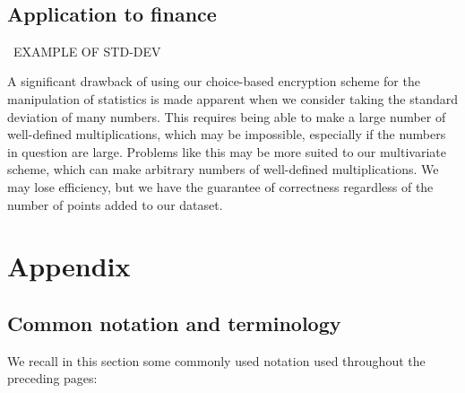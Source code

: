 \documentclass[11pt]{report}
\begin{document}
\

\section{Application to finance}

\ EXAMPLE OF STD-DEV

A significant drawback of using our choice-based encryption scheme for the manipulation of statistics is made apparent when we consider taking the standard deviation of many numbers. This requires being able to make a large number of well-defined multiplications, which may be impossible, especially if the numbers in question are large. Problems like this may be more suited to our multivariate scheme, which can make arbitrary numbers of well-defined multiplications. We may lose efficiency, but we have the guarantee of correctness regardless of the number of points added to our dataset.

\chapter{Appendix}

\section{Common notation and terminology}

We recall in this section some commonly used notation used throughout the preceding pages:
\end{document}
